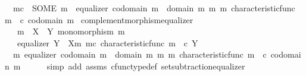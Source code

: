 \begin{isabellebody}
\ \ {\isachardoublequoteopen}m\isactrlsup c\ {\isacharequal}{\kern0pt}\ {\isacharparenleft}{\kern0pt}SOME\ m{\isacharprime}{\kern0pt}{\isachardot}{\kern0pt}\ \ equalizer\ {\isacharparenleft}{\kern0pt}codomain\ m\ {\isasymsetminus}\ {\isacharparenleft}{\kern0pt}domain\ m{\isacharcomma}{\kern0pt}\ m{\isacharparenright}{\kern0pt}{\isacharparenright}{\kern0pt}\ m{\isacharprime}{\kern0pt}\ {\isacharparenleft}{\kern0pt}characteristic{\isacharunderscore}{\kern0pt}func\ m{\isacharparenright}{\kern0pt}\ {\isacharparenleft}{\kern0pt}{\isasymf}\ {\isasymcirc}\isactrlsub c\ {\isasymbeta}\isactrlbsub codomain\ m\isactrlesub {\isacharparenright}{\kern0pt}{\isacharparenright}{\kern0pt}{\isachardoublequoteclose}\isanewline
\isanewline
{}\isamarkupfalse%
\ complement{\isacharunderscore}{\kern0pt}morphism{\isacharunderscore}{\kern0pt}equalizer{\isacharcolon}{\kern0pt}\isanewline
\ \ \ {\isachardoublequoteopen}m\ {\isacharcolon}{\kern0pt}\ X\ {\isasymrightarrow}\ Y{\isachardoublequoteclose}\ {\isachardoublequoteopen}monomorphism\ m{\isachardoublequoteclose}\isanewline
\ \ \ {\isachardoublequoteopen}equalizer\ {\isacharparenleft}{\kern0pt}Y\ {\isasymsetminus}\ {\isacharparenleft}{\kern0pt}X{\isacharcomma}{\kern0pt}m{\isacharparenright}{\kern0pt}{\isacharparenright}{\kern0pt}\ m\isactrlsup c\ {\isacharparenleft}{\kern0pt}characteristic{\isacharunderscore}{\kern0pt}func\ m{\isacharparenright}{\kern0pt}\ {\isacharparenleft}{\kern0pt}{\isasymf}\ {\isasymcirc}\isactrlsub c\ {\isasymbeta}\isactrlbsub Y\isactrlesub {\isacharparenright}{\kern0pt}{\isachardoublequoteclose}\isanewline
%
\isadelimproof
%
\endisadelimproof
%
\isatagproof
{}\isamarkupfalse%
\ {\isacharminus}{\kern0pt}\isanewline
\ \ \isamarkupfalse%
\ {\isachardoublequoteopen}{\isasymexists}\ m{\isacharprime}{\kern0pt}{\isachardot}{\kern0pt}\ equalizer\ {\isacharparenleft}{\kern0pt}codomain\ m\ {\isasymsetminus}\ {\isacharparenleft}{\kern0pt}domain\ m{\isacharcomma}{\kern0pt}\ m{\isacharparenright}{\kern0pt}{\isacharparenright}{\kern0pt}\ m{\isacharprime}{\kern0pt}\ {\isacharparenleft}{\kern0pt}characteristic{\isacharunderscore}{\kern0pt}func\ m{\isacharparenright}{\kern0pt}\ {\isacharparenleft}{\kern0pt}{\isasymf}\ {\isasymcirc}\isactrlsub c\ {\isasymbeta}\isactrlbsub codomain\ m\isactrlesub {\isacharparenright}{\kern0pt}{\isachardoublequoteclose}\isanewline
\ \ \ \ \isamarkupfalse%
\ {\isacharparenleft}{\kern0pt}simp\ add{\isacharcolon}{\kern0pt}\ assms\ cfunc{\isacharunderscore}{\kern0pt}type{\isacharunderscore}{\kern0pt}def\ set{\isacharunderscore}{\kern0pt}subtraction{\isacharunderscore}{\kern0pt}equalizer{\isacharparenright}{\kern0pt}\isanewline

\end{isabellebody}
